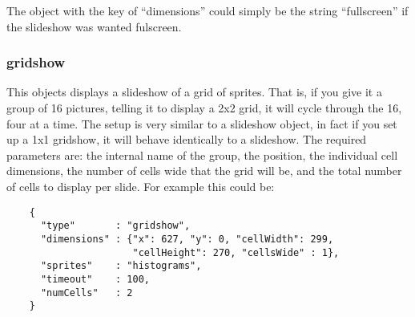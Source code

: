 \documentclass[a4paper]{article}
\begin{document}
  The object with the key of ``dimensions'' could simply be the string
  ``fullscreen'' if the slideshow was wanted fulscreen.

  \subsubsection{gridshow}
  This objects displays a slideshow of a grid of sprites. That is, if you
  give it a group of 16 pictures, telling it to display a 2x2 grid, it will
  cycle through the 16, four at a time. The setup is very similar to a
  slideshow object, in fact if you set up a 1x1 gridshow, it will behave
  identically to a slideshow.
  The required parameters are: the internal name of the group, the position,
  the individual cell dimensions, the number of cells wide that the grid
  will be, and the total number of cells to display per slide. For example
  this could be:

  \begin{verbatim}
    {
      "type"       : "gridshow",
      "dimensions" : {"x": 627, "y": 0, "cellWidth": 299, 
                      "cellHeight": 270, "cellsWide" : 1},
      "sprites"    : "histograms",
      "timeout"    : 100,
      "numCells"   : 2
    }  
  \end{verbatim}
\end{document}
